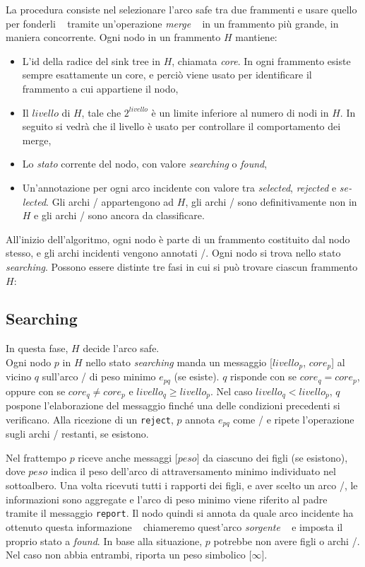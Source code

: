 \documentclass[target=bach,aauheader=,style=]{thud}
\newcommand{\eng}[1]{\foreignlanguage{english}{#1}}
\begin{document}
La procedura consiste nel selezionare l'arco \eng{safe} tra due frammenti e usare quello per fonderli \,\textendash\,~tramite un'operazione \emph{\eng{merge}}~\,\textendash\, in un frammento più grande, in maniera concorrente. Ogni nodo in un frammento $H$ mantiene:
\begin{itemize}
  \item L'id della radice del \eng{sink tree} in $H$, chiamata \emph{core}. In ogni frammento esiste sempre esattamente un core, e perciò viene usato per identificare il frammento a cui appartiene il nodo,
  \item Il $livello$ di $H$, tale che $2^{livello}$ è un limite inferiore al numero di nodi in $H$. In seguito si vedrà che il livello è usato per controllare il comportamento dei \eng{merge},
  \item Lo \emph{stato} corrente del nodo, con valore \emph{\eng{searching}} o \emph{\eng{found}},
  \item Un'annotazione per ogni arco incidente con valore tra \emph{\eng{selected}}, \emph{\eng{rejected}} e \emph{\eng{selected}}. Gli archi \selected/ appartengono ad $H$, gli archi \rejected/ sono definitivamente non in $H$ e gli archi \undecided/ sono ancora da classificare.
\end{itemize}
All'inizio dell'algoritmo, ogni nodo è parte di un frammento costituito dal nodo stesso, e gli archi incidenti vengono annotati \undecided/. Ogni nodo si trova nello stato \emph{\eng{searching}}. Possono essere distinte tre fasi in cui si può trovare ciascun frammento $H$:

\subsection{\eng{Searching}}
In questa fase, $H$ decide l'arco \eng{safe}.\\
Ogni nodo $p$ in $H$ nello stato \emph{\eng{searching}} manda un messaggio [$livello_p$, $core_p$] al vicino $q$ sull'arco \undecided/ di peso minimo $e_{pq}$ (se esiste). $q$ risponde con  se $core_q=core_p$, oppure con  se $core_q\ne core_p$ e $livello_q\geq livello_p$. Nel caso $livello_q<livello_p$, $q$ pospone l'elaborazione del messaggio finché una delle condizioni precedenti si verificano. Alla ricezione di un \lstinline{reject}, $p$ annota $e_{pq}$ come \rejected/ e ripete l'operazione sugli archi \undecided/ restanti, se esistono.

Nel frattempo $p$ riceve anche messaggi [$peso$] da ciascuno dei figli (se esistono), dove $peso$ indica il peso dell'arco di attraversamento minimo individuato nel sottoalbero. Una volta ricevuti tutti i rapporti dei figli, e aver scelto un arco \undecided/, le informazioni sono aggregate e l'arco di peso minimo viene riferito al padre tramite il messaggio \lstinline{report}. Il nodo quindi si annota da quale arco incidente ha ottenuto questa informazione  \,\textendash\,~chiameremo quest'arco \emph{sorgente}~\,\textendash\, e imposta il proprio stato a \emph{\eng{found}}. In base alla situazione, $p$ potrebbe non avere figli o archi \undecided/. Nel caso non abbia entrambi, riporta un peso simbolico [$\infty$].
\end{document}
